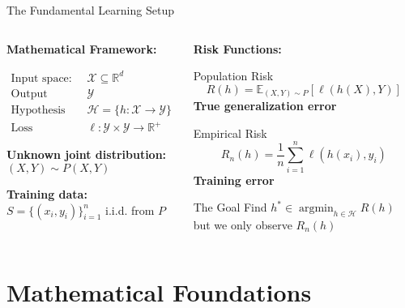 \documentclass[aspectratio=169,11pt]{beamer}
\newcommand{\E}{\mathbb{E}}
\newcommand{\argmin}{\operatorname*{argmin}}
\newcommand{\Real}{\mathbb{R}}
\begin{document}
\begin{frame}{The Fundamental Learning Setup}
\begin{columns}
\begin{column}[t]{0.5\textwidth}
\textbf{Mathematical Framework:}

\begin{align}
\text{Input space:} \quad &\mathcal{X} \subseteq \Real^d\\
\text{Output space:} \quad &\mathcal{Y}\\
\text{Hypothesis class:} \quad &\mathcal{H} = \{h: \mathcal{X} \to \mathcal{Y}\}\\
\text{Loss function:} \quad &\ell: \mathcal{Y} \times \mathcal{Y} \to \Real^+
\end{align}

\textbf{Unknown joint distribution:} $(X, Y) \sim P(X,Y)$

\textbf{Training data:} $S = \{(x_i, y_i)\}_{i=1}^n$ i.i.d. from $P$
\end{column}
\begin{column}[t]{0.5\textwidth}
\textbf{Risk Functions:}

\begin{block}{Population Risk}
\[R(h) = \E_{(X,Y) \sim P}[\ell(h(X), Y)]\]
\textbf{True generalization error}
\end{block}

\begin{block}{Empirical Risk}
\[R_n(h) = \frac{1}{n}\sum_{i=1}^n \ell(h(x_i), y_i)\]
\textbf{Training error}
\end{block}

\begin{alertblock}{The Goal}
Find $h^* \in \argmin_{h \in \mathcal{H}} R(h)$ but we only observe $R_n(h)$
\end{alertblock}
\end{column}
\end{columns}
\end{frame}

\section{Mathematical Foundations}
\end{document}

